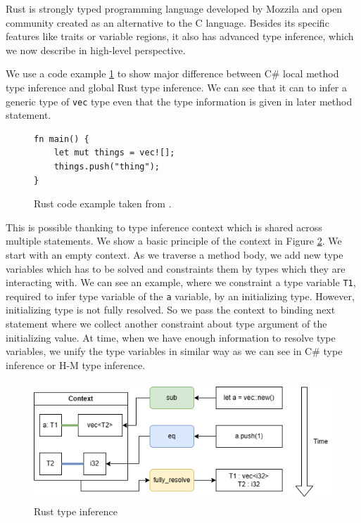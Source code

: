 Rust is strongly typed programming language developed by Mozzila and open community created as an alternative to the C language.
Besides its specific features like traits or variable regions, it also has advanced type inference, which we now describe in high-level perspective.
\par
{}
We use a code example \ref{img58:rustCodeExample} to show major difference between C\# local method type inference and global Rust type inference.
We can see that it can to infer a generic type of \texttt{vec} type even that the type information is given in later method statement. 
\begin{figure}
\begin{lstlisting}
fn main() {
    let mut things = vec![];
    things.push("thing");
}
\end{lstlisting}
\caption{Rust code example taken from \cite{online:rustTypeInference}.}
\label{img58:rustCodeExample}
\end{figure}
\par
This is possible thanking to type inference context which is shared across multiple statements.
We show a basic principle of the context in Figure \ref{img57:rustTypeInference}.
We start with an empty context.
As we traverse a method body, we add new type variables which has to be solved and constraints them by types which they are interacting with.
We can see an example, where we constraint a type variable \texttt{T1}, required to infer type variable of the \texttt{a} variable, by an initializing type.
However, initializing type is not fully resolved.
So we pass the context to binding next statement where we collect another constraint about type argument of the initializing value.
At time, when we have enough information to resolve type variables, we unify the type variables in similar way as we can see in C\# type inference or H-M type inference.
\par
\begin{figure}
\centering
\includegraphics[width=120mm, height=45mm]{../img/RustTypeInference.png}
\caption{Rust type inference}
\label{img57:rustTypeInference}
\end{figure}
